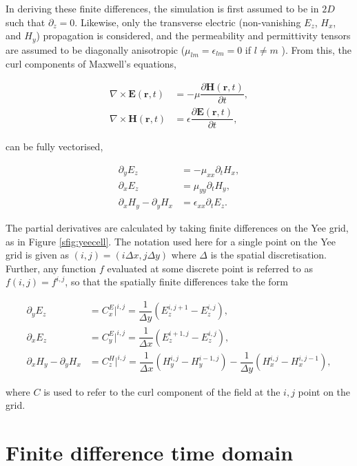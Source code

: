 In deriving these finite differences, the simulation is first assumed to be in $2D$ such that $\partial_z = 0$. Likewise, only the transverse electric (non-vanishing $E_z$, $H_x$, and $H_y$) propagation is considered, and the permeability and permittivity tensors are assumed to be diagonally anisotropic ($\mu_{lm} = \epsilon_{lm} = 0$ if $l \neq m$ ). From this, the curl components of Maxwell's equations, 

\begin{align}
	\nabla \times \bm{E}(\bm{r},t) &= -\mu \dfrac{\partial \bm{H}(\bm{r},t)}{\partial t}, \\
	\nabla \times \bm{H}(\bm{r},t) &= \epsilon \dfrac{\partial \bm{E}(\bm{r},t)}{\partial t},
\end{align}

can be fully vectorised,

\begin{align}
\partial_y E_z &= - \mu_{xx} \partial_t H_x, \\
 \partial_x  E_z &=  \mu_{yy} \partial_t H_y, \\
\partial_x H_y - \partial_y H_x &= \epsilon_{xx}\partial_t E_z.
\end{align}

The partial derivatives are calculated by taking finite differences on the Yee grid, as in Figure \ref{sfig:yeecell}. The notation used here for a single point on the Yee grid is given as $(i,j) = (i \Delta x, j \Delta y)$ where $\Delta$ is the spatial discretisation. Further, any function $f$ evaluated at some discrete point is referred to as $f(i,j) = f^{i,j}$, so that the spatially finite differences take the form 

\begin{align}
\partial_y E_z &= C_x^E|^{i,j} = \dfrac{1}{\Delta y} (E_z^{i,j+1}-E_z^{i,j}), \label{c1}\\
 \partial_x  E_z &= C_y^E|^{i,j} = \dfrac{1}{\Delta x} (E_z^{i+1,j}-E_z^{i,j}), \label{c2} \\
\partial_x H_y - \partial_y H_x &= C_z^H|^{i,j} = \dfrac{1}{\Delta x} (H_y^{i,j}-H_y^{i-1,j}) - \dfrac{1}{\Delta y} (H_x^{i,j}-H_x^{i,j-1}), \label{c3}
\end{align}

where $C$ is used to refer to the curl component of the field at the $i,j$ point on the grid.

\section{Finite difference time domain}

